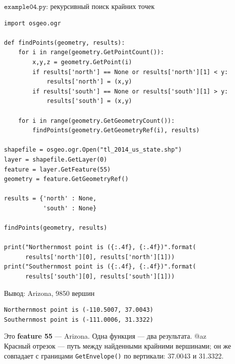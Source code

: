 \documentclass[aspectratio=169,10pt]{beamer}
\makeatletter
\newcommand{\usePic}[1]{\expandafter\csname pic@#1\endcsname}
\makeatother
\begin{document}
\begin{frame}[fragile]{$\texttt{example04.py}$: рекурсивный поиск крайних точек}
\begin{Verbatim}[fontsize=\scriptsize]
import osgeo.ogr

def findPoints(geometry, results):
    for i in range(geometry.GetPointCount()):
        x,y,z = geometry.GetPoint(i)
        if results['north'] == None or results['north'][1] < y:
            results['north'] = (x,y)
        if results['south'] == None or results['south'][1] > y:
            results['south'] = (x,y)

    for i in range(geometry.GetGeometryCount()):
        findPoints(geometry.GetGeometryRef(i), results)

shapefile = osgeo.ogr.Open("tl_2014_us_state.shp")
layer = shapefile.GetLayer(0)
feature = layer.GetFeature(55)
geometry = feature.GetGeometryRef()

results = {'north' : None,
           'south' : None}

findPoints(geometry, results)

print("Northernmost point is ({:.4f}, {:.4f})".format(
      results['north'][0], results['north'][1]))
print("Southernmost point is ({:.4f}, {:.4f})".format(
      results['south'][0], results['south'][1]))
\end{Verbatim}
\end{frame}

\begin{frame}[fragile]{Вывод: Arizona, 9850 вершин}
\begin{Verbatim}[numbers=none]
Northernmost point is (-110.5007, 37.0043)
Southernmost point is (-111.0006, 31.3322)
\end{Verbatim}
\vspace{0.2em}
{\footnotesize Это \textbf{feature 55} --- Arizona. Одна функция ---
два результата.}
\vspace{0.2em}
\centering
\usePic{az}\\[0.1cm]
{\footnotesize Красный отрезок --- путь между найденными крайними
вершинами; он же совпадает с границами \texttt{GetEnvelope()}
по вертикали: 37.0043 и 31.3322.}
\end{frame}
\end{document}
